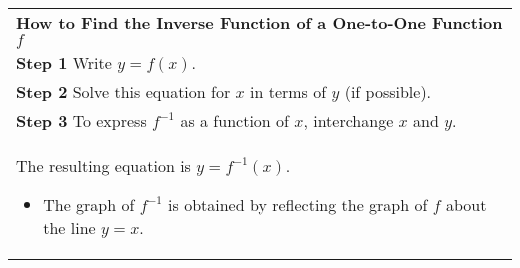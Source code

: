 \documentclass[fleqn]{article}
\begin{document}
\begin{center}
\def\arraystretch{1.3}
{\setlength{\tabcolsep}{16pt}
\begin{tabularx}{.9\textwidth}{|X|}
\hline
	\vspace{1pt}
	\textbf{How to Find the Inverse Function of a One-to-One Function $f$}\\[6pt]
	\hspace{12pt} \textbf{Step 1} \hspace{12pt} Write $y = f(x)$. \\
	\hspace{12pt} \textbf{Step 2} \hspace{12pt} Solve this equation for $x$ in terms of $y$ (if possible). \\
	\hspace{12pt} \textbf{Step 3} \hspace{12pt} To express $f^{-1}$ as a function of $x$, interchange $x$ and $y$.\\
	\hspace{55pt} \hspace{12pt} The resulting equation is $y = f^{-1}(x)$.
	\vspace{5pt}
	\begin{itemize}
	\item The graph of $f^{-1}$ is obtained by reflecting the graph of $f$ about the line $y = x$.
	\end{itemize}
	\\[6pt]
\hline
\end{tabularx}}
\vspace{6pt}


\vspace{12pt}


\end{center}
\end{document}
